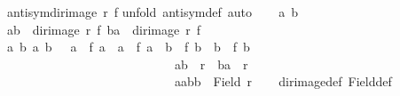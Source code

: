 \begin{isabellebody}
\ {\isachardoublequoteopen}antisym{\isacharparenleft}{\kern0pt}dir{\isacharunderscore}{\kern0pt}image\ r\ f{\isacharparenright}{\kern0pt}{\isachardoublequoteclose}\isanewline
%
\isadelimproof
%
\endisadelimproof
%
\isatagproof
{}\isamarkupfalse%
{\isacharparenleft}{\kern0pt}unfold\ antisym{\isacharunderscore}{\kern0pt}def{\isacharcomma}{\kern0pt}\ auto{\isacharparenright}{\kern0pt}\isanewline
\ \ \isamarkupfalse%
\ a{\isacharprime}{\kern0pt}\ b{\isacharprime}{\kern0pt}\isanewline
\ \ \isamarkupfalse%
\ {\isachardoublequoteopen}{\isacharparenleft}{\kern0pt}a{\isacharprime}{\kern0pt}{\isacharcomma}{\kern0pt}b{\isacharprime}{\kern0pt}{\isacharparenright}{\kern0pt}\ {\isasymin}\ dir{\isacharunderscore}{\kern0pt}image\ r\ f{\isachardoublequoteclose}\ {\isachardoublequoteopen}{\isacharparenleft}{\kern0pt}b{\isacharprime}{\kern0pt}{\isacharcomma}{\kern0pt}a{\isacharprime}{\kern0pt}{\isacharparenright}{\kern0pt}\ {\isasymin}\ dir{\isacharunderscore}{\kern0pt}image\ r\ f{\isachardoublequoteclose}\isanewline
\ \ \isamarkupfalse%
\ \isamarkupfalse%
\ a{}\ b{}\ a{}\ b{}\ \ {}{\isacharcolon}{\kern0pt}\ {\isachardoublequoteopen}a{\isacharprime}{\kern0pt}\ {\isacharequal}{\kern0pt}\ f\ a{}\ {\isasymand}\ a{\isacharprime}{\kern0pt}\ {\isacharequal}{\kern0pt}\ f\ a{}\ {\isasymand}\ b{\isacharprime}{\kern0pt}\ {\isacharequal}{\kern0pt}\ f\ b{}\ {\isasymand}\ b{\isacharprime}{\kern0pt}\ {\isacharequal}{\kern0pt}\ f\ b{}{\isachardoublequoteclose}\ \isanewline
\ \ \ \ \ \ \ \ \ \ \ \ \ \ \ \ \ \ \ \ \ \ \ \ \ \ \ {}{\isacharcolon}{\kern0pt}\ {\isachardoublequoteopen}{\isacharparenleft}{\kern0pt}a{}{\isacharcomma}{\kern0pt}b{}{\isacharparenright}{\kern0pt}\ {\isasymin}\ r\ {\isasymand}\ {\isacharparenleft}{\kern0pt}b{}{\isacharcomma}{\kern0pt}a{}{\isacharparenright}{\kern0pt}\ {\isasymin}\ r\ {\isachardoublequoteclose}\ \isanewline
\ \ \ \ \ \ \ \ \ \ \ \ \ \ \ \ \ \ \ \ \ \ \ \ \ \ \ {}{\isacharcolon}{\kern0pt}\ {\isachardoublequoteopen}{\isacharbraceleft}{\kern0pt}a{}{\isacharcomma}{\kern0pt}a{}{\isacharcomma}{\kern0pt}b{}{\isacharcomma}{\kern0pt}b{}{\isacharbraceright}{\kern0pt}\ {\isasymle}\ Field\ r{\isachardoublequoteclose}\isanewline
\ \ \isamarkupfalse%
\ dir{\isacharunderscore}{\kern0pt}image{\isacharunderscore}{\kern0pt}def\ Field{\isacharunderscore}{\kern0pt}def\ \isamarkupfalse%

\end{isabellebody}

